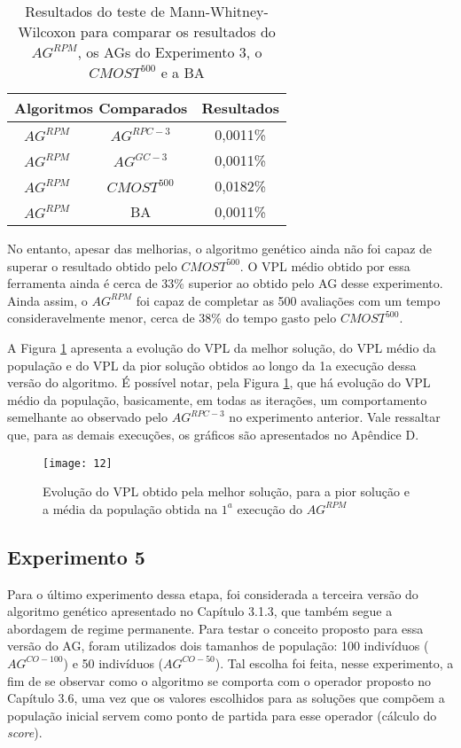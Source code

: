 \begin{table}[H]
\centering
\caption{Resultados do teste de Mann-Whitney-Wilcoxon para comparar os resultados do $AG^{RPM}$, os AGs do Experimento 3, o $CMOST^{500}$ e a BA}
\label{tab:mw4_1}
\begin{tabular}{|c|c|c|}
\hline
\multicolumn{2}{|c|}{Algoritmos Comparados} & Resultados \\ \hline
$AG^{RPM}$ & $AG^{RPC-3}$ & 0,0011\% \\ \hline
$AG^{RPM}$ & $AG^{GC-3}$ & 0,0011\% \\ \hline
$AG^{RPM}$ & $CMOST^{500}$ & 0,0182\% \\ \hline
$AG^{RPM}$ & BA & 0,0011\% \\ \hline


\end{tabular}
\end{table}

No entanto, apesar das melhorias, o algoritmo genético ainda não foi capaz de superar o resultado obtido pelo $CMOST^{500}$. O VPL médio obtido por essa ferramenta ainda é cerca de 33\% superior ao obtido pelo AG desse experimento. Ainda assim, o $AG^{RPM}$ foi capaz de completar as 500 avaliações com um tempo consideravelmente menor, cerca de 38\% do tempo gasto pelo $CMOST^{500}$.

A Figura \ref{fig:graph4_1} apresenta a evolução do VPL da melhor solução, do VPL médio da população e do VPL da pior solução obtidos ao longo da 1a execução dessa versão do algoritmo. É possível notar, pela Figura \ref{fig:graph4_1}, que há evolução do VPL médio da população, basicamente, em todas as iterações, um comportamento semelhante ao observado pelo $AG^{RPC-3}$ no experimento anterior. Vale ressaltar que, para as demais execuções, os gráficos são apresentados no Apêndice D.

\begin{figure}[H]
\centering

\texttt{[image: 12]}

\caption{Evolução do VPL obtido pela melhor solução, para a pior solução e a média da população obtida na $1^a$ execução do $AG^{RPM}$}
\label{fig:graph4_1}
\end{figure}

\subsection{Experimento 5}
\label{ch:5_Experimento5}
Para o último experimento dessa etapa, foi considerada a terceira versão do algoritmo genético apresentado no Capítulo 3.1.3, que também segue a abordagem de regime permanente. Para testar o conceito proposto para essa versão do AG, foram utilizados dois tamanhos de população: 100 indivíduos ($AG^{CO-{100}}$) e 50 indivíduos ($AG^{CO-{50}}$). Tal escolha foi feita, nesse experimento, a fim de se observar como o algoritmo se comporta com o operador proposto no Capítulo 3.6, uma vez que os valores escolhidos para as soluções que compõem a população inicial servem como ponto de partida para esse operador (cálculo do \textit{score}).

